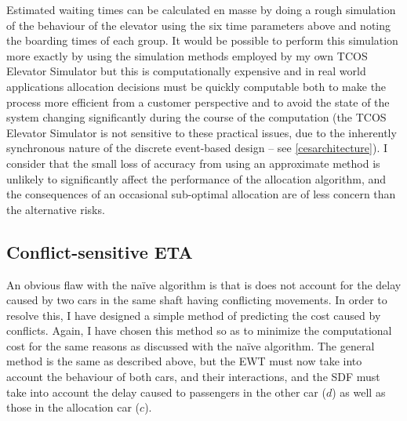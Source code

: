 \documentclass{UoYCSproject}
\begin{document}
Estimated waiting times can be calculated en masse by doing a rough simulation of the behaviour of the elevator using the six time parameters above and noting the boarding times of each group.  It would be possible to perform this simulation more exactly by using the simulation methods employed by my own TCOS Elevator Simulator but this is computationally expensive and in real world applications allocation decisions must be quickly computable both to make the process more efficient from a customer perspective and to avoid the state of the system changing significantly during the course of the computation (the TCOS Elevator Simulator is not sensitive to these practical issues, due to the inherently synchronous nature of the discrete event-based design -- see \autoref{cesarchitecture}).  I consider that the small loss of accuracy from using an approximate method is unlikely to significantly affect the performance of the allocation algorithm, and the consequences of an occasional sub-optimal allocation are of less concern than the alternative risks.

\subsection{Conflict-sensitive ETA}
\label{algETAconflict}

An obvious flaw with the na\"{i}ve algorithm is that is does not account for the delay caused by two cars in the same shaft having conflicting movements.  In order to resolve this, I have designed a simple method of predicting the cost caused by conflicts.  Again, I have chosen this method so as to minimize the computational cost for the same reasons as discussed with the na\"{i}ve algorithm.  The general method is the same as described above, but the EWT must now take into account the behaviour of both cars, and their interactions, and the SDF must take into account the delay caused to passengers in the other car ($d$) as well as those in the allocation car ($c$).
\end{document}
